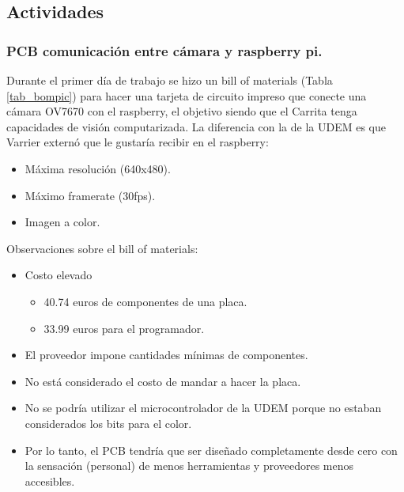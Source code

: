 \subsection{Actividades}

\subsubsection{PCB comunicación entre cámara y raspberry pi.}
Durante el primer día de trabajo se hizo un bill of materials (Tabla \ref{tab_bompic}) para hacer una tarjeta de circuito impreso que conecte una cámara OV7670 con el raspberry, el objetivo siendo que el Carrita tenga capacidades de visión computarizada. La diferencia con la de la UDEM es que Varrier externó que le gustaría recibir en el raspberry:
\begin{itemize}
	\item Máxima resolución (640x480).
	\item Máximo framerate (30fps).
	\item Imagen a color.
\end{itemize}

Observaciones sobre el bill of materials:
\begin{itemize}
	\item Costo elevado
	\begin{itemize}
		\item 40.74 euros de componentes de una placa.
		\item 33.99 euros para el programador.
	\end{itemize}
	\item El proveedor impone cantidades mínimas de componentes.
	\item No está considerado el costo de mandar a hacer la placa.
	\item No se podría utilizar el microcontrolador de la UDEM porque no estaban considerados los bits para el color.
	\item Por lo tanto, el PCB tendría que ser diseñado completamente desde cero con la sensación (personal) de menos herramientas y proveedores menos accesibles.
\end{itemize}


